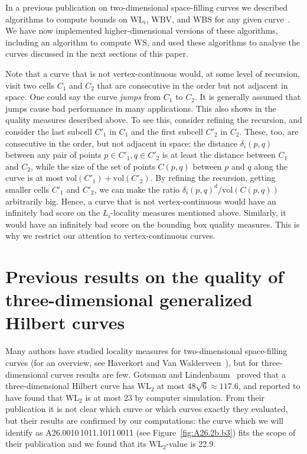 \documentclass[11pt,a4paper]{article}
\def\WLEuc{\ensuremath{\mathrm{WL}_2}\xspace}
\def\WS{\ensuremath{\mathrm{WS}}\xspace}
\def\WBV{\ensuremath{\mathrm{WBV}}\xspace}
\def\WBS{\ensuremath{\mathrm{WBS}}\xspace}
\begin{document}
In a previous publication on two-dimensional space-filling curves we described algorithms to compute bounds on $\mathrm{WL}_i$, \WBV, and \WBS for any given curve~\cite{Haverkort}. We have now implemented higher-dimensional versions of these algorithms, including an algorithm to compute \WS, and used these algorithms to analyse the curves discussed in the next sections of this paper.

Note that a curve that is not vertex-continuous would, at some level of recursion, visit two cells $C_1$ and $C_2$ that are consecutive in the order but not adjacent in space. One could say the curve \emph{jumps} from $C_1$ to $C_2$. It is generally assumed that jumps cause bad performance in many applications. This also shows in the quality measures described above. To see this, consider refining the recursion, and consider the last subcell $C'_1$ in $C_1$ and the first subcell $C'_2$ in $C_2$. These, too, are consecutive in the order, but not adjacent in space: the distance $\delta_i(p,q)$ between any pair of points $p \in C'_1, q \in C'_2$ is at least the distance between $C_1$ and $C_2$, while the size of the set of points $C(p,q)$ between $p$ and $q$ along the curve is at most $\mathrm{vol}(C'_1) + \mathrm{vol}(C'_2)$. By refining the recursion, getting smaller cells $C'_1$ and $C'_2$, we can make the ratio $\delta_i(p,q)^d / \mathrm{vol}(C(p,q))$ arbitrarily big. Hence, a curve that is not vertex-continuous would have an infinitely bad score on the $L_i$-locality measures mentioned above. Similarly, it would have an infinitely bad score on the bounding box quality measures. This is why we restrict our attention to vertex-continuous curves.

\section{Previous results on the quality of three-dimensional generalized Hilbert curves}

Many authors have studied locality measures for two-dimensional space-filling curves (for an overview, see Haverkort and Van Walderveen~\cite{Haverkort}), but for three-dimensional curves results are few. Gotsman and Lindenbaum~\cite{Gotsman} proved that a three-dimensional Hilbert curve has \WLEuc at most $48\sqrt 6 \approx 117.6$, and reported to have found that \WLEuc is at most 23 by computer simulation. From their publication it is not clear which curve or which curves exactly they evaluated, but their results are confirmed by our computations: the curve which we will identify as A26.0010\,1011.1011\,0011 (see Figure~\ref{fig:A26.2b.b3}) fits the scope of their publication and we found that its \WLEuc-value is 22.9.
\end{document}

